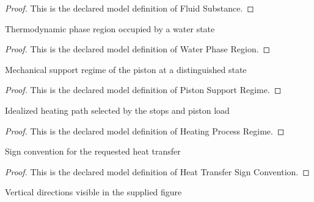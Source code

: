 \begin{proof}
  This is the declared model definition of Fluid Substance.
\end{proof}
\begin{definition}
  \label{def:physics:phyx-mini-0463:phyxminiproblems-problemphyxmini0463-waterphaseregion}
  Thermodynamic phase region occupied by a water state
\end{definition}
\begin{proof}
  This is the declared model definition of Water Phase Region.
\end{proof}
\begin{definition}
  \label{def:physics:phyx-mini-0463:phyxminiproblems-problemphyxmini0463-pistonsupportregime}
  Mechanical support regime of the piston at a distinguished state
\end{definition}
\begin{proof}
  This is the declared model definition of Piston Support Regime.
\end{proof}
\begin{definition}
  \label{def:physics:phyx-mini-0463:phyxminiproblems-problemphyxmini0463-heatingprocessregime}
  Idealized heating path selected by the stops and piston load
\end{definition}
\begin{proof}
  This is the declared model definition of Heating Process Regime.
\end{proof}
\begin{definition}
  \label{def:physics:phyx-mini-0463:phyxminiproblems-problemphyxmini0463-heattransfersignconvention}
  Sign convention for the requested heat transfer
\end{definition}
\begin{proof}
  This is the declared model definition of Heat Transfer Sign Convention.
\end{proof}
\begin{definition}
  \label{def:physics:phyx-mini-0463:phyxminiproblems-problemphyxmini0463-verticaldirection}
  Vertical directions visible in the supplied figure
\end{definition}
